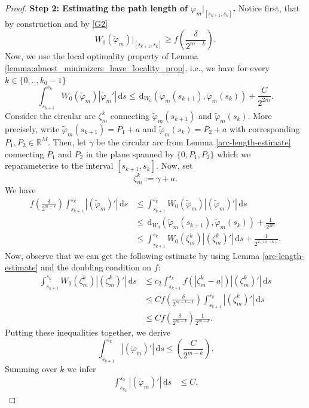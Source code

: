 \documentclass[a4paper, 11pt, reqno]{amsart}
\theoremstyle{plain}
\theoremstyle{definition}
\theoremstyle{remark}
\newcommand{\R}{\mathbb R}
\newcommand{\dd}{\,\mathrm{d}}
\begin{document}
\begin{proof}
    \textbf{Step 2: Estimating the path length of $\varphi_m|_{[s_{k+1}, s_k]}$.} 
    Notice first, that by construction and by \ref{G2}
    \[
        W_0(\tilde \varphi_m)|_{[s_{k + 1}, s_{k}]} \geq f\left(\frac{\delta}{2^{m - k}}\right).
    \]
    Now, we use the local optimality property of Lemma \ref{lemma:almost_minimizers_have_locality_prop}, i.e., we have for every $k \in \{0,.., k_0 - 1\}$ 
    \[
        \int_{s_{k + 1}}^{s_{k}} W_0(\tilde \varphi_m)|\tilde \varphi_m'| \,\mathrm{d}s \leq \dd_{W_0}\left(\tilde \varphi_m(s_{k + 1}), \tilde \varphi_m(s_{k })\right) + \frac{C}{2^{2m}}.
    \]
    Consider the circular arc $\zeta^k_m$ connecting $\tilde \varphi_m(s_{k+1})$ and $\tilde \varphi_m(s_k)$. More precisely, write $\tilde \varphi_m(s_{k+1}) = P_1 + a$ and $\tilde \varphi_m(s_{k}) = P_2 + a$ with corresponding $P_1, P_2 \in \R^M$. Then, let $\gamma$ be the circular arc from Lemma \ref{arc-length-estimate} connecting $P_1$ and $P_2$ in the plane spanned by $\{0, P_1, P_2\}$ which we reparameterise to the interval $[s_{k+1}, s_k]$. Now, set 
    \[
        \zeta^k_m := \gamma + a.
    \]
    We have 
    \begin{align*}
        f\left(\frac{\delta}{2^{m - k}}\right) \int_{s_{k + 1}}^{s_{k}}|(\tilde \varphi_m)'|\, \mathrm{d}s 
        &\leq \int_{s_{k + 1}}^{s_{k}} W_0(\tilde \varphi_m)|(\tilde \varphi_m)'|\, \mathrm{d}s \\
        &\leq \dd_{W_0}\left(\tilde \varphi_m(s_{k + 1}), \tilde \varphi_m( s_{k })\right) + \frac{1}{2^{2m}} \\
        &\leq \int_{s_{k + 1}}^{s_{k}}W_0(\zeta_m^{k})|(\zeta_m^{k})'|\, \mathrm{d}s + \frac{1}{2^{2(m - k)}}.
    \end{align*}
    Now, observe that we can get the following estimate by using Lemma \ref{arc-length-estimate} and the doubling condition on $f$:
    \begin{align*}
        \int_{s_{k + 1}}^{s_{k}} W_0(\zeta^{k}_m)|(\zeta^{k}_m)'|\, \mathrm{d}s & \leq c_2\int_{s_{k + 1}}^{s_{k}}f(|\zeta^k_m-a|)|( \zeta^{k}_m)'|\, \mathrm{d}s \\
        & \leq C f\left(\frac{\delta}{2^{m - k - 1}}\right)\int_{s_{k + 1}}^{s_{k}}|( \zeta_m^{k})'|\, \mathrm{d}s \\
        &\leq Cf\left(\frac{\delta}{2^{m-k}} \right) \frac{1}{2^{m - k}}.
    \end{align*}
    Putting these inequalities together, we derive
    \[
        \int_{s_{k+1}}^{s_k}|(\tilde \varphi_m)'|\, \mathrm{d}s \leq \left(\frac{C}{2^{m - k}} \right) .
    \]
    Summing over $k$ we infer
    \begin{align}\label{eq:geodesic_estimate_1}
        \int_{s_{k_0}}^{s_{0}} |(\tilde \varphi_m)'| \, \mathrm{d}s &\leq C.
    \end{align}


\end{proof}
\end{document}
